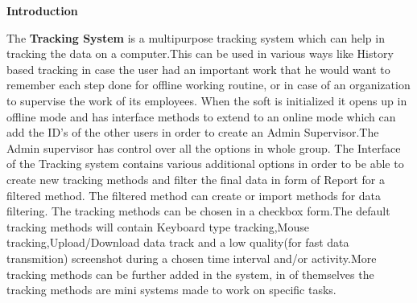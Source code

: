 \graphicspath{ {pic/} }
\begin{flushleft}
\setlength{\parindent}{2ex}\par
\tableofcontents
\newpage
\setcounter{page}{1}
\textbf{Introduction} \par
The \textbf{Tracking System} is a multipurpose tracking system which can help in tracking the data on a computer.This can be used in various ways like History based tracking in case the user had an important work that he would want to remember each step done for offline working routine, or in case of an organization to supervise the work of its employees. When the soft is initialized it opens up in offline mode and has interface methods to extend to an online mode which can add the ID’s of the other users in order to create an Admin Supervisor.The Admin supervisor has control over all the options in whole group. The Interface of the Tracking system contains various additional options in order to be able to create new tracking methods and filter the final data in form of Report for a filtered method.
The filtered method can create or import methods for data filtering. The tracking methods can be chosen in a checkbox form.The default tracking methods will contain Keyboard type tracking,Mouse tracking,Upload/Download data track and a low quality(for fast data transmition) screenshot during a chosen time interval and/or activity.More tracking methods can be further added in the system, in of themselves the tracking methods are mini systems made to work on specific tasks.
\end{flushleft}
\clearpage